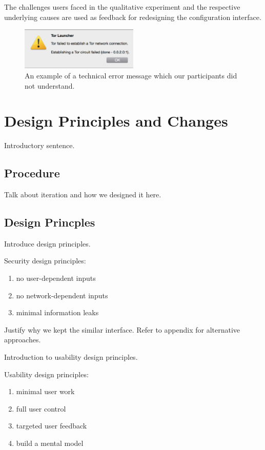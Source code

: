 \documentclass[USenglish,oneside,twocolumn]{article}
\begin{document}
{The challenges users faced in the qualitative experiment and the respective underlying causes are used as feedback for redesigning the configuration interface. 

\begin{figure}[t]
  \centering
    \includegraphics[width=0.5\textwidth]{error.png}
    \caption{An example of a technical error message which our participants did not understand.}
\label{fig:error}
\end{figure}
}

\section{Design Principles and Changes}
\label{sec:design} 

{\color {blue}
Introductory sentence.
}

\subsection{Procedure} 
{\color {blue}
Talk about iteration and how we designed it here.
}

\subsection{Design Princples} 
{\color {blue}
Introduce design principles. 

Security design principles: 
\begin{enumerate}
\item no user-dependent inputs 
\item no network-dependent inputs
\item minimal information leaks
\end{enumerate} 

Justify why we kept the similar interface. Refer to appendix for alternative approaches. 

Introduction to usability design principles. 

Usability design principles: 
\begin{enumerate}
\item minimal user work
\item full user control  
\item targeted user feedback
\item build a mental model
\end{enumerate} 
}
\end{document}
